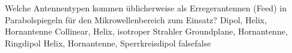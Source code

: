     {Welche Antennentypen kommen üblicherweise als Erregerantennen (Feed) in Parabolspiegeln für den Mikrowellenbereich zum Einsatz?}
    {Dipol, Helix, Hornantenne}
    {Collinear, Helix, isotroper Strahler}
    {Groundplane, Hornantenne, Ringdipol}
    {Helix, Hornantenne, Sperrkreisdipol}
    {false}{false}